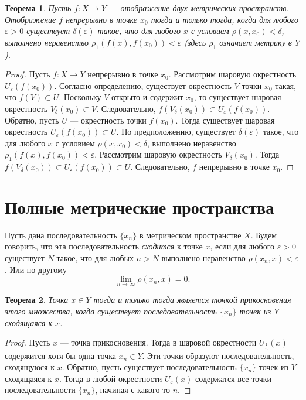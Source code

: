 \documentclass[12pt, titlepage, oneside]{amsbook}
\newtheorem{theorem}{Теорема}[chapter]
\theoremstyle{definition}
\theoremstyle{remark}
\begin{document}
\begin{theorem}
	\label{Met8}
	Пусть $f\colon X\rightarrow Y$ --- отображение двух метрических пространств. Отображение $f$ непрерывно в точке $x_0$ тогда и только тогда, когда для любого $\varepsilon>0$ существует $\delta(\varepsilon)$ такое, что для любого $x$ с условием $\rho(x,x_0)<\delta$, выполнено неравенство $\rho_1(f(x),f(x_0))<\varepsilon$ (здесь $\rho_1$ означает метрику в $Y$).
\end{theorem}

\begin{proof}
	Пусть $f\colon X\rightarrow Y$ непрерывно в точке $x_0$. Рассмотрим шаровую окрестность $U_{\varepsilon}(f(x_0))$. Согласно определению, существует окрестность $V$ точки $x_0$ такая, что $f(V)\subset U$. Поскольку $V$ открыто и содержит $x_0$, то существует шаровая окрестность $V_{\delta}(x_0)\subset V$. Следовательно, $f(V_{\delta}(x_0))\subset U_{\varepsilon}(f(x_0))$. Обратно, пусть $U$ --- окрестность точки $f(x_0)$. Тогда существует шаровая окрестность $U_{\varepsilon}(f(x_0))\subset U$. По предположению, существует $\delta(\varepsilon)$ такое, что для любого $x$ с условием $\rho(x,x_0)<\delta$, выполнено неравенство $\rho_1(f(x),f(x_0))<\varepsilon$. Рассмотрим шаровую окрестность $V_{\delta}(x_0)$. Тогда $f(V_{\delta}(x_0))\subset U_{\varepsilon}(f(x_0))\subset U$. Следовательно, $f$ непрерывно в точке $x_0$.
\end{proof}

\section{Полные метрические пространства}

Пусть дана последовательность $\{x_n\}$ в метрическом пространстве $X$. Будем говорить, что эта последовательность \emph{сходится} к точке $x$, если для любого $\varepsilon>0$ существует $N$ такое, что для любых $n>N$ выполнено неравенство $\rho(x_n,x)<\varepsilon$. Или по другому $$\lim\limits_{n\rightarrow\infty}\rho(x_n,x)=0.$$

\begin{theorem}
	\label{Pol1}
	Точка $x\in Y$ тогда и только тогда является точкой прикосновения этого множества, когда существует последовательность $\{x_n\}$ точек из $Y$ сходящаяся к $x$.
\end{theorem}

\begin{proof}
	Пусть $x$ --- точка прикосновения. Тогда в шаровой окрестности $U_{\frac{1}{n}}(x)$ содержится хотя бы одна точка $x_n\in Y$. Эти точки образуют последовательность, сходящуюся к $x$. Обратно, пусть существует последовательность $\{x_n\}$ точек из $Y$ сходящаяся к $x$. Тогда в любой окрестности $U_{\varepsilon}(x)$ содержатся все точки последовательности $\{x_n\}$, начиная с какого-то $n$.
\end{proof}
\end{document}
